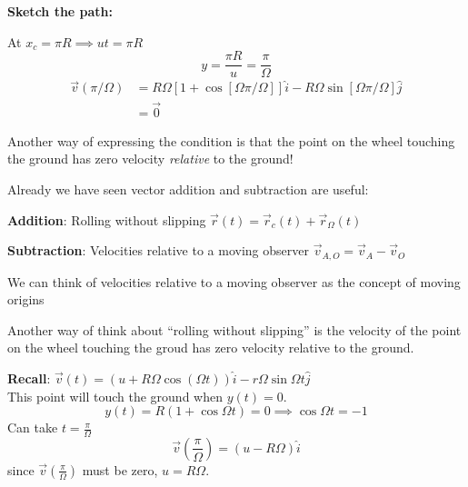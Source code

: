 \documentclass[10pt]{scrartcl}
\begin{document}
\begin{example}
\textbf{Sketch the path:}
\begin{center}
  \end{center} 
At $x_c = \pi R \implies ut = \pi R$
\[y = \frac{\pi R}{u} = \frac{\pi}{\Omega}\]
\[\begin{aligned}
	\vec{v}(\pi/\Omega) &= R\Omega[1 + \cos[\Omega \pi/\Omega]]\hat{i} - R\Omega\sin[\Omega\pi/\Omega]\hat{j}\\
	&= \vec{0}
\end{aligned}
 \]
 
 Another way of expressing the condition is that the point on the wheel touching the ground has zero velocity \emph{relative} to the ground!

\end{example}



Already  we have seen vector addition and subtraction are useful:

\textbf{Addition}: Rolling without slipping $\vec{r}(t) = \vec{r}_c(t) + \vec{r}_\Omega(t)$

\textbf{Subtraction}: Velocities relative to a moving observer $\vec{v}_{A,O} = \vec{v}_A - \vec{v}_O$

\begin{note}
    We can think of velocities relative to a moving observer as the concept of moving origins
\end{note}

\begin{example}
    Another way of think about ``rolling without slipping'' is the velocity of the point on the wheel touching the groud has zero velocity relative to the ground.

    \textbf{Recall}: $\vec{v}(t) = \left(u + R\Omega\cos(\Omega t)\right)\hat{i} - r\Omega\sin\Omega t\hat{j}$\\

    This point will touch the ground when $y(t) = 0$.
    \[
        y(t) = R(1 + \cos\Omega t) = 0 \implies \cos\Omega t = -1
    \]
    Can take $t = \frac{\pi}{\Omega}$
    \[
        \vec{v}(\frac{\pi}{\Omega}) = (u - R\Omega)\hat{i}
    \]
    since $\vec{v}(\frac{\pi}{\Omega})$ must be zero, $u = R\Omega$.
\end{example}
\end{document}
